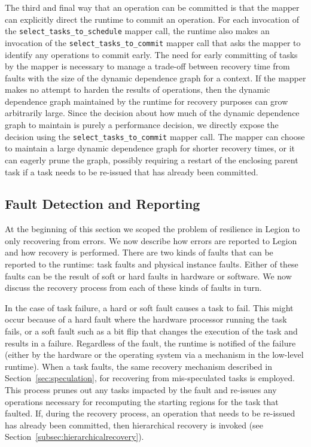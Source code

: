 The third and final way that an operation can be committed is
that the mapper can explicitly direct the runtime to commit
an operation. For each invocation of the 
{\tt select\_tasks\_to\_schedule} mapper call, the runtime also
makes an invocation of the {\tt select\_tasks\_to\_commit} mapper call that asks
the mapper to identify any operations to commit early. The 
need for early committing of tasks by the mapper is necessary
to manage a trade-off between recovery time from faults with
the size of the dynamic dependence graph for a context. 
If the mapper makes no attempt to harden the results of 
operations, then the dynamic dependence graph maintained by
the runtime for recovery purposes can grow arbitrarily large.
Since the decision about how much of the dynamic dependence
graph to maintain is purely a performance decision, we 
directly expose the decision using the {\tt select\_tasks\_to\_commit}
mapper call. The mapper can choose to maintain a large 
dynamic dependence graph for shorter recovery times, or it
can eagerly prune the graph, possibly requiring a restart
of the enclosing parent task if a task needs to be re-issued
that has already been committed.

\subsection{Fault Detection and Reporting}
\label{subsec:faultreport}
At the beginning of this section we scoped the problem of 
resilience in Legion to only recovering from errors. We now
describe how errors are reported to Legion and how recovery
is performed. There are two kinds of faults that can be
reported to the runtime: task faults and physical instance
faults. Either of these faults can be the result of soft
or hard faults in hardware or software. We now discuss the
recovery process from each of these kinds of faults in turn.

In the case of task failure, a hard or soft fault causes a task to fail.
This might occur because of a hard fault where the hardware processor 
running the task fails, or a soft fault such as a bit flip that changes
the execution of the task and results in a failure. Regardless
of the fault, the runtime is notified of the failure (either
by the hardware or the operating system via a mechanism in the
low-level runtime). When a task faults, the same recovery mechanism 
described in Section~\ref{sec:speculation}, for recovering from 
mis-speculated tasks is employed. This process prunes out any tasks 
impacted by the fault and re-issues any operations necessary for 
recomputing the starting regions for the task that faulted.
If, during the recovery process, an operation that needs to 
be re-issued has already been committed, then hierarchical
recovery is invoked (see Section~\ref{subsec:hierarchicalrecovery}).

